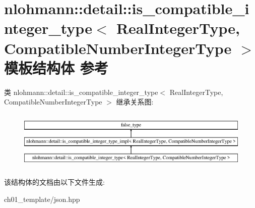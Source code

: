 \hypertarget{structnlohmann_1_1detail_1_1is__compatible__integer__type}{}\section{nlohmann\+::detail\+::is\+\_\+compatible\+\_\+integer\+\_\+type$<$ Real\+Integer\+Type, Compatible\+Number\+Integer\+Type $>$ 模板结构体 参考}
\label{structnlohmann_1_1detail_1_1is__compatible__integer__type}
类 nlohmann\+::detail\+::is\+\_\+compatible\+\_\+integer\+\_\+type$<$ Real\+Integer\+Type, Compatible\+Number\+Integer\+Type $>$ 继承关系图\+:\begin{figure}[H]
\begin{center}
\leavevmode
\includegraphics[height=2.818792cm]{structnlohmann_1_1detail_1_1is__compatible__integer__type}
\end{center}
\end{figure}


该结构体的文档由以下文件生成\+:\begin{DoxyCompactItemize}
\item 
ch01\+\_\+template/json.\+hpp\end{DoxyCompactItemize}
